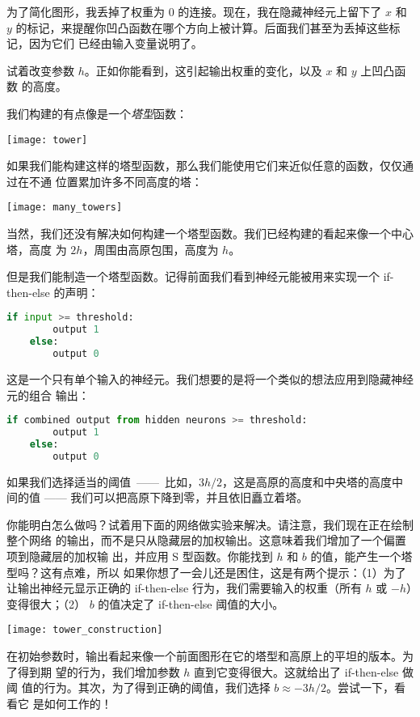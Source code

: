 为了简化图形，我丢掉了权重为 $0$ 的连接。现在，我在隐藏神经元上留下了 $x$ 和 $y$
的标记，来提醒你凹凸函数在哪个方向上被计算。后面我们甚至为丢掉这些标记，因为它们
已经由输入变量说明了。

试着改变参数 $h$。正如你能看到，这引起输出权重的变化，以及 $x$ 和 $y$ 上凹凸函数
的高度。

我们构建的有点像是一个\emph{塔型}函数：
\begin{center}
  \texttt{[image: tower]}
\end{center}

如果我们能构建这样的塔型函数，那么我们能使用它们来近似任意的函数，仅仅通过在不通
位置累加许多不同高度的塔：
\begin{center}
  \texttt{[image: many\_towers]}
\end{center}

当然，我们还没有解决如何构建一个塔型函数。我们已经构建的看起来像一个中心塔，高度
为 $2h$，周围由高原包围，高度为 $h$。

但是我们能制造一个塔型函数。记得前面我们看到神经元能被用来实现一个 {\serif
  if-then-else} 的声明：
\begin{lstlisting}[language=Python]
    if input >= threshold: 
        output 1
    else:
        output 0
\end{lstlisting}

这是一个只有单个输入的神经元。我们想要的是将一个类似的想法应用到隐藏神经元的组合
输出：
\begin{lstlisting}[language=Python]
    if combined output from hidden neurons >= threshold:
        output 1
    else:
        output 0
\end{lstlisting}

如果我们选择适当的阈值~——~比如，$3h/2$，这是高原的高度和中央塔的高度中间的值 ——
我们可以把高原下降到零，并且依旧矗立着塔。

你能明白怎么做吗？试着用下面的网络做实验来解决。请注意，我们现在正在绘制整个网络
的输出，而不是只从隐藏层的加权输出。这意味着我们增加了一个偏置项到隐藏层的加权输
出，并应用 S 型函数。你能找到 $h$ 和 $b$ 的值，能产生一个塔型吗？这有点难，所以
如果你想了一会儿还是困住，这是有两个提示：（1）为了让输出神经元显示正确的
{\serif if-then-else} 行为，我们需要输入的权重（所有 $h$ 或 $-h$）变得很大；（2）
$b$ 的值决定了 {\serif if-then-else} 阈值的大小。
\begin{center}
  \texttt{[image: tower\_construction]}
\end{center}

在初始参数时，输出看起来像一个前面图形在它的塔型和高原上的平坦的版本。为了得到期
望的行为，我们增加参数 $h$ 直到它变得很大。这就给出了 {\serif if-then-else} 做阈
值的行为。其次，为了得到正确的阈值，我们选择 $b \approx -3h/2$。尝试一下，看看它
是如何工作的！

